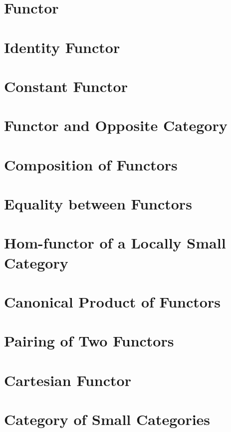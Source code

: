 \section{Functor}
    
\section{Identity Functor}
    
\section{Constant Functor}
    
\section{Functor and Opposite Category}
    
\section{Composition of Functors}
    
\section{Equality between Functors}
    
\section{Hom-functor of a Locally Small Category}
    
\section{Canonical Product of Functors}
    
\section{Pairing of Two Functors}
    
\section{Cartesian Functor}
    
\section{Category of Small Categories}
    
